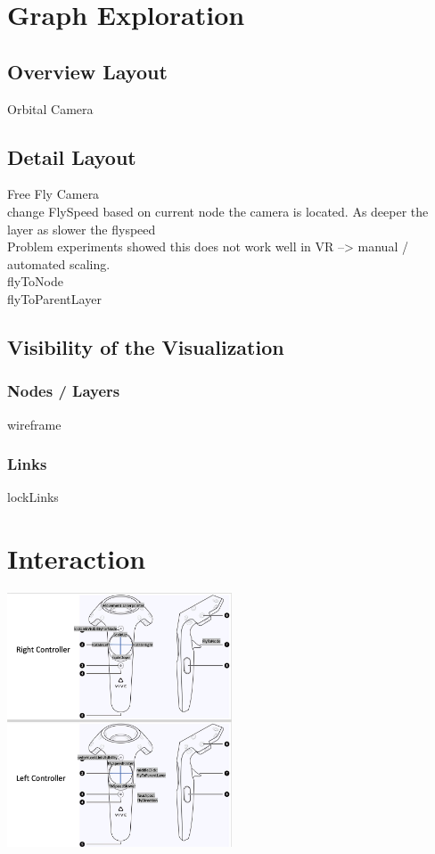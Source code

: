 \section{Graph Exploration}

\subsection{Overview Layout}
Orbital Camera

\subsection{Detail Layout}
Free Fly Camera \\
change FlySpeed based on current node the camera is located. As deeper the layer as slower the flyspeed \\
Problem experiments showed this does not work well in VR --> manual / automated scaling. \\

flyToNode \\
flyToParentLayer \\

\subsection{Visibility of the Visualization}
\subsubsection{Nodes / Layers}
wireframe
\subsubsection{Links}
lockLinks

\section{Interaction}
\includegraphics[width=0.5\textwidth]{chapters/graphics/controllerMapping.jpg}
